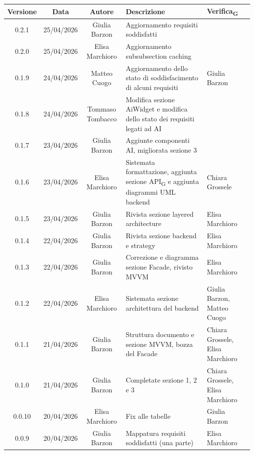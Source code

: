 \documentclass[11pt,a4paper]{article}
\newcommand{\gls}[1]{#1\textsubscript{G}}
\begin{document}
\begin{table}[H]
    \centering          
    \begin{tabular}{|c|c|c|>{\raggedright\arraybackslash}p{}|p{}|}
        \hline
        \textbf{Versione} & \textbf{Data} & \textbf{Autore} & \textbf{Descrizione} & \textbf{\gls{Verifica}} \\
        \hline
        0.2.1 & 25/04/2026 & Giulia Barzon & Aggiornamento requisiti soddisfatti & \\
        \hline
        0.2.0 & 25/04/2026 & Elisa Marchioro & Aggiornamento subsubsection caching & \\
        \hline
        0.1.9 & 24/04/2026 & Matteo Cuogo & Aggiornamento dello stato di soddisfacimento di alcuni requisiti & Giulia Barzon\\
        \hline
        0.1.8 & 24/04/2026 & Tommaso Tombacco & Modifica sezione AiWidget e modifica dello stato dei requisiti legati ad AI & \\
        \hline
        0.1.7 & 23/04/2026 & Giulia Barzon & Aggiunte componenti AI, migliorata sezione 3 & \\
        \hline
        0.1.6 & 23/04/2026 & Elisa Marchioro & Sistemata formattazione, aggiunta sezione \gls{API} e aggiunta diagrammi UML backend & Chiara Grossele \\
        \hline
        0.1.5 & 23/04/2026 & Giulia Barzon & Rivista sezione layered architecture & Elisa Marchioro\\
        \hline
        0.1.4 & 22/04/2026 & Giulia Barzon & Rivista sezione backend e strategy & Elisa Marchioro\\
        \hline
        0.1.3 & 22/04/2026 & Giulia Barzon & Correzione e diagramma sezione Facade, rivisto MVVM & Elisa Marchioro\\
        \hline
        0.1.2 & 22/04/2026 & Elisa Marchioro & Sistemata sezione architettura del backend & Giulia Barzon, Matteo Cuogo\\
        \hline
        0.1.1 & 21/04/2026 & Giulia Barzon & Struttura documento e sezione MVVM, bozza del Facade & Chiara Grossele, Elisa Marchioro\\
        \hline
        0.1.0 & 21/04/2026 & Giulia Barzon & Completate sezione 1, 2 e 3 & Chiara Grossele, Elisa Marchioro\\
        \hline
        0.0.10 & 20/04/2026 & Elisa Marchioro & Fix alle tabelle & Giulia Barzon\\
        \hline
        0.0.9 & 20/04/2026 & Giulia Barzon & Mappatura requisiti soddisfatti (una parte) & Elisa Marchioro\\

\end{tabular}
\end{table}
\end{document}
